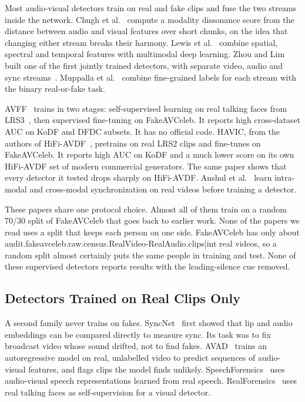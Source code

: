 Most audio-visual detectors train on real and fake clips and fuse the two
streams inside the network. Chugh et al.~\cite{notmade} compute a modality
dissonance score from the distance between audio and visual features over
short chunks, on the idea that changing either stream breaks their harmony.
Lewis et al.~\cite{lewis2020} combine spatial, spectral and temporal features
with multimodal deep learning. Zhou and Lim built one of the first jointly
trained detectors, with separate video, audio and sync streams~\cite{zhou2021}.
Muppalla et al.~\cite{muppalla2023} combine fine-grained labels for each
stream with the binary real-or-fake task.

AVFF~\cite{avff} trains in two stages: self-supervised learning on real
talking faces from LRS3~\cite{lrs3}, then supervised fine-tuning on
FakeAVCeleb. It reports high cross-dataset AUC on KoDF and DFDC subsets. It
has no official code. HAVIC, from the authors of HiFi-AVDF~\cite{havic},
pretrains on real LRS2 clips and fine-tunes on FakeAVCeleb. It reports high
AUC on KoDF and a much lower score on its own HiFi-AVDF set of modern
commercial generators. The same paper shows that every detector it tested
drops sharply on HiFi-AVDF. Anshul et al.~\cite{anshul2025} learn intra-modal
and cross-modal synchronization on real videos before training a detector.

These papers share one protocol choice. Almost all of them train on a random
70/30 split of FakeAVCeleb that goes back to earlier work. None of the papers
we read uses a split that keeps each person on one side. FakeAVCeleb has only
about {{audit.fakeavceleb.raw.census.RealVideo-RealAudio.clips|int}} real
videos, so a random split almost certainly puts the same people in training
and test. None of these supervised detectors reports results with the
leading-silence cue removed.

\subsection{Detectors Trained on Real Clips Only}

A second family never trains on fakes. SyncNet~\cite{syncnet} first showed
that lip and audio embeddings can be compared directly to measure sync. Its
task was to fix broadcast video whose sound drifted, not to find fakes.
AVAD~\cite{avad} trains an autoregressive model on real, unlabelled video to
predict sequences of audio-visual features, and flags clips the model finds
unlikely. SpeechForensics~\cite{speechforensics} uses audio-visual speech
representations learned from real speech. RealForensics~\cite{realforensics}
uses real talking faces as self-supervision for a visual detector.

